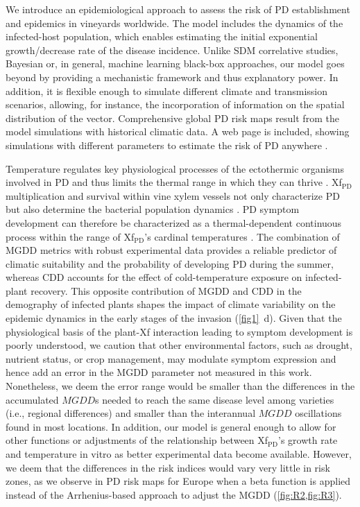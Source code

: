     We introduce an epidemiological approach to assess the risk of PD
    establishment and epidemics in vineyards worldwide. The model includes the
    dynamics of the infected-host population, which enables estimating the
    initial exponential growth/decrease rate of the disease incidence. Unlike
    SDM correlative studies, Bayesian or, in general, machine learning
    black-box approaches, our model goes beyond by providing a mechanistic
    framework and thus explanatory power. In addition, it is flexible enough to
    simulate different climate and transmission scenarios, allowing, for
    instance, the incorporation of information on the spatial distribution of
    the vector. Comprehensive global PD risk maps result from the model
    simulations with historical climatic data. A web page is included, showing
    simulations with different parameters to estimate the risk of PD anywhere
    \cite{Webpage}.

    Temperature regulates key physiological processes of the ectothermic
    organisms involved in PD and thus limits the thermal range in which they
    can thrive \cite{Coakley1999}. Xf$_{\textrm{PD}}$ multiplication and
    survival within vine xylem vessels not only characterize PD but also
    determine the bacterial population dynamics
    \cite{fry1990multiplication,Feil2001}. PD symptom development can therefore
    be characterized as a thermal-dependent continuous process within
    the range of  Xf$_{\textrm{PD}}$'s cardinal temperatures \cite{Scherm1994}.
    The combination of MGDD metrics with robust experimental data provides a
    reliable predictor of climatic suitability and the probability of
    developing PD during the summer, whereas CDD accounts for the effect of
    cold-temperature exposure on infected-plant recovery. This opposite
    contribution of MGDD and CDD in the demography of infected plants shapes
    the impact of climate variability on the epidemic dynamics in the early
    stages of the invasion (\cref{fig1}~\textcolor{ref_color}{d}). Given that
    the physiological basis
    of the plant-Xf interaction leading to symptom development is poorly
    understood, we caution that other environmental factors, such as drought,
    nutrient status, or crop management, may modulate symptom expression and
    hence add an error in the MGDD parameter not measured in this work.
    Nonetheless, we deem the error range would be smaller than the differences
    in the accumulated $MGDD$s needed to reach the same disease level among
    varieties (i.e., regional differences) and smaller than the interannual
$MGDD$ oscillations found in most locations. In addition, our model is general
    enough to allow for other functions or adjustments of the relationship
    between Xf$_{\textrm{PD}}$'s growth rate and temperature in vitro
    as better experimental data become available. However, we deem that the
    differences in the risk indices would vary very little in risk zones, as we
    observe in PD risk maps for Europe when a beta function is applied instead
    of the Arrhenius-based approach to adjust the MGDD (\cref{fig:R2,fig:R3}).


